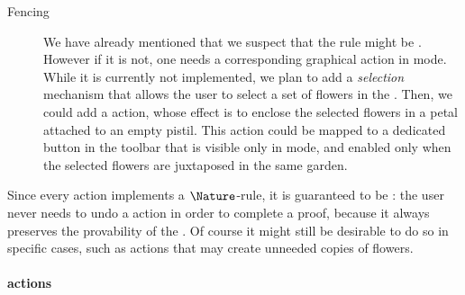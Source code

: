 \begin{scope}
\begin{description}
  \item[Fencing] We have already mentioned that we suspect that the
   rule might be . However if it is not, one needs a
  corresponding graphical action in \Proof mode. While it is currently not
  implemented, we plan to add a \emph{selection} mechanism that allows the user
  to select a set of flowers in the . Then, we could add a 
  action, whose effect is to enclose the selected flowers in a petal attached to
  an empty pistil. This action could be mapped to a dedicated button in the
  toolbar that is visible only in \Proof mode, and enabled only when the
  selected flowers are juxtaposed in the same garden.
\end{description}

Since every \Proof action implements a $\Nature$-rule, it is guaranteed to be
\emph{}: the user never needs to undo a \Proof action in order to
complete a proof, because it always preserves the provability of the . Of
course it might still be desirable to do so in specific cases, such as
 actions that may create unneeded copies of flowers.

\paragraph{\Edit actions}


\end{scope}
